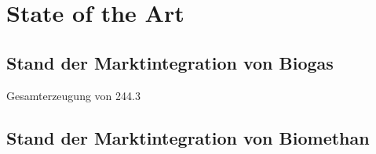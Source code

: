 \section{State of the Art}

\subsection{Stand der Marktintegration von Biogas}



Gesamterzeugung von \SI{244.3}{\twh}

\subsection{Stand der Marktintegration von Biomethan}




